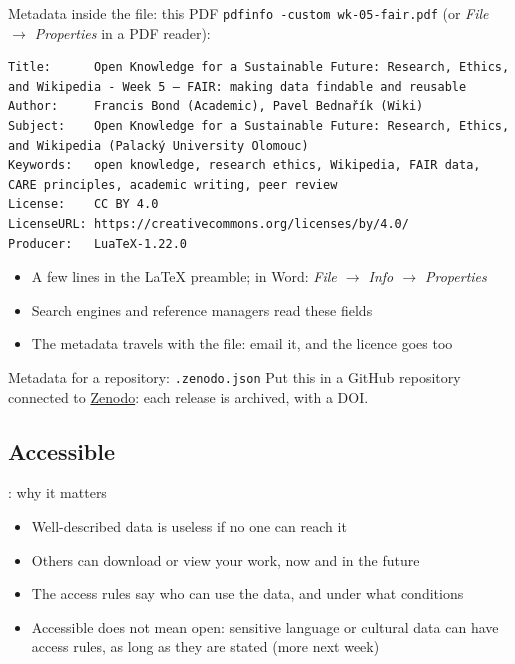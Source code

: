 \documentclass[aspectratio=169]{beamer}
\begin{document}
\begin{frame}[fragile]{Metadata inside the file: this PDF}
\texttt{pdfinfo -custom wk-05-fair.pdf} (or \emph{File $\rightarrow$
Properties} in a PDF reader):
\begin{Verbatim}[fontsize=\scriptsize,breaklines]
Title:      Open Knowledge for a Sustainable Future: Research, Ethics, and Wikipedia - Week 5 — FAIR: making data findable and reusable
Author:     Francis Bond (Academic), Pavel Bednařík (Wiki)
Subject:    Open Knowledge for a Sustainable Future: Research, Ethics, and Wikipedia (Palacký University Olomouc)
Keywords:   open knowledge, research ethics, Wikipedia, FAIR data, CARE principles, academic writing, peer review
License:    CC BY 4.0
LicenseURL: https://creativecommons.org/licenses/by/4.0/
Producer:   LuaTeX-1.22.0
\end{Verbatim}
\begin{itemize}
  \item A few lines in the \LaTeX{} preamble; in Word: \emph{File $\rightarrow$
    Info $\rightarrow$ Properties}
  \item Search engines and reference managers read these fields
  \item The metadata travels with the file: email it, and the licence goes too
\end{itemize}
\end{frame}

\begin{frame}[fragile]{Metadata for a repository: \texttt{.zenodo.json}}
\small Put this in a GitHub repository connected to
\href{https://zenodo.org/}{Zenodo}: each release is archived, with a DOI.
\end{frame}

\subsection{Accessible}
\begin{frame}{: why it matters}
\begin{itemize}
  \item Well-described data is useless if no one can reach it
  \item Others can download or view your work, now and in the future
  \item The access rules say who can use the data, and under what conditions
  \item Accessible does not mean open: sensitive language or cultural data
    can have access rules, as long as they are stated (more next week)
\end{itemize}
\end{frame}
\end{document}
